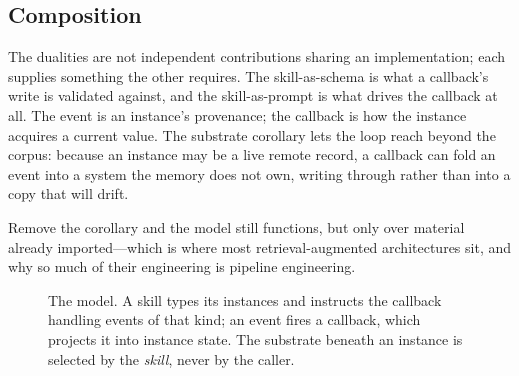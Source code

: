 \documentclass[journal,nofonttune]{IEEEtran}
\begin{document}
\subsection{Composition}
The dualities are not independent contributions sharing an implementation;
each supplies something the other requires. The skill-as-schema is what a
callback's write is validated against, and the skill-as-prompt is what drives
the callback at all. The event is an instance's provenance; the callback is
how the instance acquires a current value. The substrate corollary lets the
loop reach beyond the corpus: because an instance may be a live remote
record, a callback can fold an event into a system the memory does not own,
writing through rather than into a copy that will drift.

Remove the corollary and the model still functions, but only over material
already imported---which is where most retrieval-augmented architectures sit,
and why so much of their engineering is pipeline engineering.

\begin{figure}[!t]
\centering
{}
\caption{The model. A skill types its instances and instructs the callback
handling events of that kind; an event fires a callback, which projects it
into instance state. The substrate beneath an instance is selected by the
\emph{skill}, never by the caller.}
\label{fig:model}
\end{figure}
\end{document}
